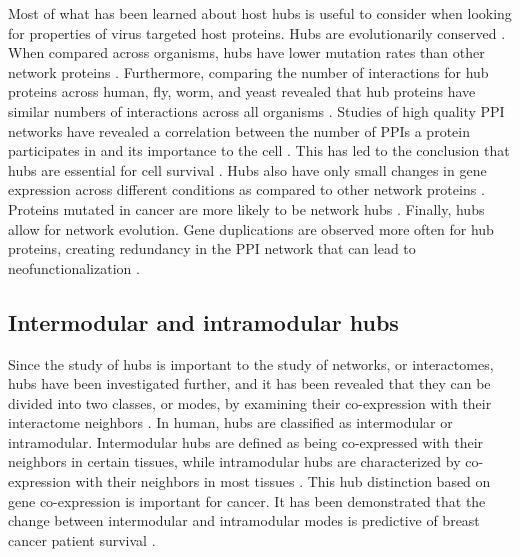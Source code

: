 Most of what has been learned about host hubs is useful to consider
when looking for properties of virus targeted host proteins. Hubs are
evolutionarily conserved \cite{fraser2002evolutionary}. When compared
across organisms, hubs have lower mutation rates than other network
proteins \cite{batada2006evolutionary}. Furthermore, comparing the
number of interactions for hub proteins across human, fly, worm, and
yeast revealed that hub proteins have similar numbers of interactions
across all organisms \cite{fox09}. Studies of high quality PPI
networks have revealed a correlation between the number of PPIs a
protein participates in and its importance to the cell
\cite{he2006hubs}. This has led to the conclusion that hubs are
essential for cell survival \cite{han04,batada2006evolutionary}. Hubs
also have only small changes in gene expression across different
conditions as compared to other network proteins \cite{lu2007hubs}.
Proteins mutated in cancer are more likely to be network hubs
\cite{jonsson2006global}. Finally, hubs allow for network
evolution. Gene duplications are observed more often for hub proteins,
creating redundancy in the PPI network that can lead to
neofunctionalization
\cite{kafri2008preferential,teshima2008neofunctionalization}.

\subsection{Intermodular and intramodular hubs}

Since the study of hubs is important to the study of networks, or
interactomes, hubs have been investigated further, and it has been
revealed that they can be divided into two classes, or modes, by
examining their co-expression with their interactome neighbors
\cite{taylor09}. In human, hubs are classified as intermodular or
intramodular. Intermodular hubs are defined as being co-expressed with
their neighbors in certain tissues, while intramodular hubs are
characterized by co-expression with their neighbors in most tissues
\cite{taylor09}. This hub distinction based on gene co-expression is
important for cancer. It has been demonstrated that the change between
intermodular and intramodular modes is predictive of breast cancer
patient survival \cite{taylor09}.

